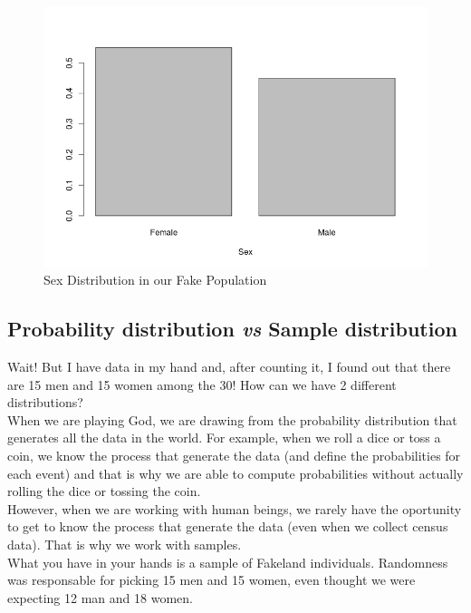 \documentclass[11pt]{article}
\begin{document}
\begin{figure}[htp]
\centering
\includegraphics[scale=0.50]{sex_distribution.png}
\caption{Sex Distribution in our Fake Population}
\label{f1}
\end{figure}

	\subsection*{Probability distribution \emph{vs} Sample distribution}

	Wait! But I have data in my hand and, after counting it, I found out that there are 15 men and 15 women among the 30! How can we have 2 different distributions?\\

	When we are playing God, we are drawing from the probability distribution that generates all the data in the world. For example, when we roll a dice or toss a coin, we know the process that generate the data (and define the probabilities for each event) and that is why we are able to compute probabilities without actually rolling the dice or tossing the coin.\\
	
	However, when we are working with human beings, we rarely have the oportunity to get to know the process that generate the data (even when we collect census data). That is why we work with samples.\\
	
	What you have in your hands is a sample of Fakeland individuals. Randomness was responsable for picking 15 men and 15 women, even thought we were expecting 12 man and 18 women.\\
\end{document}
